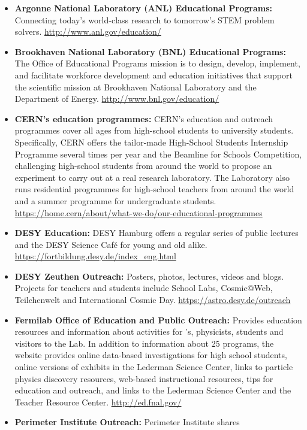 \begin{itemize}
\item
  \textbf{Argonne National Laboratory (ANL) Educational Programs:}
  Connecting today's world-class research to tomorrow's STEM problem
  solvers. \url{http://www.anl.gov/education/}
\item
  \textbf{Brookhaven National Laboratory (BNL) Educational Programs:}
  The Office of Educational Programs mission is to design, develop,
  implement, and facilitate workforce development and education
  initiatives that support the scientific mission at Brookhaven National
  Laboratory and the Department of Energy.
  \url{http://www.bnl.gov/education/}
\item
  \textbf{CERN's education programmes:} CERN's education and outreach
  programmes cover all ages from high-school students to university
  students. Specifically, CERN offers the tailor-made High-School
  Students Internship Programme several times per year and the Beamline
  for Schools Competition, challenging high-school students from around
  the world to propose an experiment to carry out at a real research
  laboratory. The Laboratory also runs residential programmes for
  high-school teachers from around the world and a summer programme for
  undergraduate students.
  \url{https://home.cern/about/what-we-do/our-educational-programmes}
\item
  \textbf{DESY Education:} DESY Hamburg offers a regular series of
  public lectures and the DESY Science Café for young and old alike.
  \url{https://fortbildung.desy.de/index_eng.html}
\item
  \textbf{DESY Zeuthen Outreach:} Posters, photos, lectures, videos and
  blogs. Projects for teachers and students include School Labs,
  Cosmic@Web, Teilchenwelt and International Cosmic Day.
  \url{https://astro.desy.de/outreach}
\item
  \textbf{Fermilab Office of Education and Public Outreach:} Provides
  education resources and information about activities for 's,
  physicists, students and visitors to the Lab. In addition to
  information about 25 programs, the website provides online data-based
  investigations for high school students, online versions of exhibits
  in the Lederman Science Center, links to particle physics discovery
  resources, web-based instructional resources, tips for education and
  outreach, and links to the Lederman Science Center and the Teacher
  Resource Center. \url{http://ed.fnal.gov/}
\item
  \textbf{Perimeter Institute Outreach:} Perimeter Institute shares

\end{itemize}
